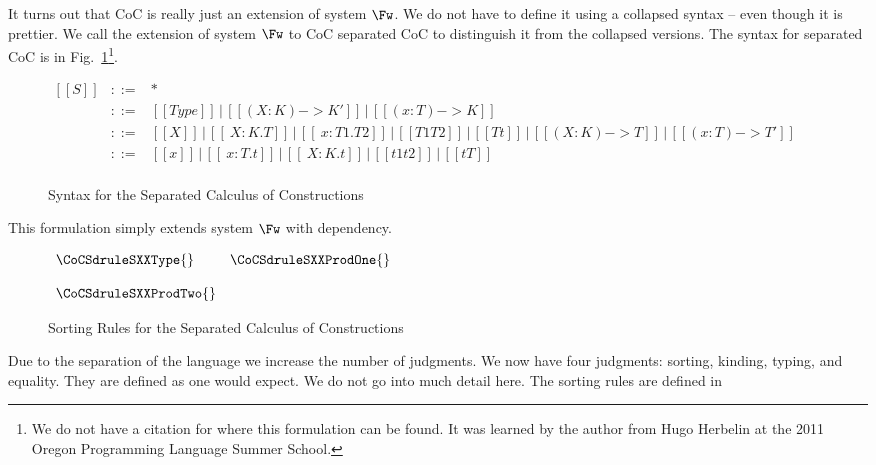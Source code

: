 It turns out that CoC is really just an extension of system $\Fw$.  We
do not have to define it using a collapsed syntax -- even though it is
prettier.  We call the extension of system $\Fw$ to CoC separated CoC
to distinguish it from the collapsed versions.  The syntax for
separated CoC is in Fig.~\ref{fig:CoC_sep_syntax}\footnote{We do not
  have a citation for where this formulation can be found.  It was
  learned by the author from Hugo Herbelin at the 2011 Oregon
  Programming Language Summer School.}.  
\begin{figure}
  \begin{center}
    \begin{math}
      \begin{array}{lll}
        [[S]] & ::= & *\\
        [[K]] & ::= & [[Type]]\,|\,[[( X : K ) -> K']]\,|\,[[( x : T ) -> K]]\\
        [[T]] & ::= & [[X]]\,|\,[[\ X : K . T]]\,|\,[[\ x : T1 . T2]]\,|\,[[T1 T2]]\,|\,[[T t]]\,|\,[[( X : K ) -> T]]\,|\,[[( x : T ) -> T']]\\
        [[t]] & ::= & [[x]]\,|\,[[\ x : T . t]]\,|\,[[\ X : K . t]]\,|\,[[t1 t2]]\,|\,[[t T]]\\
      \end{array}
    \end{math}
  \end{center}
  \caption{Syntax for the Separated Calculus of Constructions}
  \label{fig:CoC_sep_syntax}
\end{figure}
This formulation simply extends system $\Fw$ with dependency.
\begin{figure}
  \begin{center}
    \begin{math}
      \begin{array}{lll}
        \CoCSdruleSXXType{} & \CoCSdruleSXXProdOne{}\\
        &\\
        \CoCSdruleSXXProdTwo{}
      \end{array}
    \end{math}
  \end{center}
  \caption{Sorting Rules for the Separated Calculus of Constructions}
  \label{fig:CoC_sep_sorting}
\end{figure}
Due to the separation of the language we increase the number of
judgments.  We now have four judgments: sorting, kinding, typing, and
equality.  They are defined as one would expect.  We do not go into
much detail here. The sorting rules are defined in
